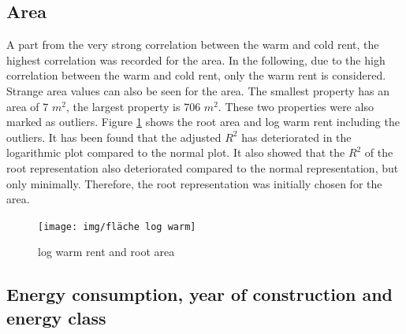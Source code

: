 \subsection{Area}

A part from the very strong correlation between the warm and cold rent, the highest correlation was recorded for the area. In the following, due to the high correlation between the warm and cold rent, only the warm rent is considered. Strange area values can also be seen for the area. The smallest property has an area of 7 $m^2$, the largest property is 706 $m^2$. These two properties were also marked as outliers. Figure  \ref{fig: fläche log warm} shows the root area and log warm rent including the outliers. It has been found that the adjusted $R^2$ has deteriorated in the logarithmic plot compared to the normal plot. It also showed that the $R^2$ of the root representation also deteriorated compared to the normal representation, but only minimally. Therefore, the root representation was initially chosen for the area.

\begin{figure}[H]
	\centering
	\texttt{[image: img/fläche log warm]}
	\caption{log warm rent and root area}
	\label{fig: fläche log warm}
\end{figure}


\subsection{Energy consumption, year of construction and energy class}

